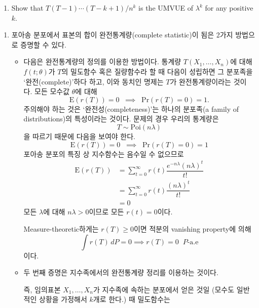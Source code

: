\documentclass[answers]{exam}
\begin{document}
\begin{questions}
\begin{enumerate}
    \item Show that $T\left(T-1\right)\cdots \left(T-k+1\right)/n^{k}$ is the UMVUE of $\lambda^{k}$ for any positive $k$.
   \end{enumerate}
   \begin{solution}
    \begin{enumerate}
      \item 포아송 분포에서 표본의 합이 완전통계량(complete statistic)이 됨은 2가지 방법으로 증명할 수 있다.
      \begin{itemize}
        \item 다음은 완전통계량의 정의를 이용한 방법이다. 통계량 $T\left(X_{1},\ldots,X_{n}\right)$에 대해 $f\left(t;\theta\right)$가 $T$의 밀도함수 혹은 질량함수라 할 때 다음이 성립하면 그 분포족을 `완전(complete)'하다 하고, 이와 동치인 명제는 $T$가 완전통계량이라는 것이다. 모든 모수값 $\theta$에 대해
        $$
          \mathrm{E}\left(r\left(T\right)\right)=0\;\;\implies\;\;\mathrm{Pr}\left(r\left(T\right)=0\right)=1.
        $$
        주의해야 하는 것은 `완전성(completeness)'는 하나의 분포족(a family of distributions)의 특성이라는 것이다. 문제의 경우 우리의 통계량은
        $$
          T \sim \mathrm{Poi}\left(n\lambda\right)
        $$
        을 따르기 때문에 다음을 보여야 한다.
        \begin{equation}
          \mathrm{E}\left(r\left(T\right)\right) = 0 \;\;\implies \;\; \mathrm{Pr}\left(r\left(T\right)=0\right)=1
        \end{equation}
        포아송 분포의 특징 상 지수함수는 음수일 수 없으므로
        \begin{align}
          \mathrm{E}\left(r\left(T\right)\right) &= \sum_{t=0}^{\infty}r\left(t\right)\dfrac{e^{-n\lambda}\left(n\lambda\right)^{t}}{t!}\\
          &= \sum_{t=0}^{\infty}r\left(t\right)\dfrac{\left(n\lambda\right)^{t}}{t!}\\
          &=0
        \end{align}
        모든 $\lambda$에 대해 $n\lambda > 0$이므로 모든 $r\left(t\right)=0$이다.\par
        Measure-theoretic하게는 $r\left(T\right)\geq0$이면 적분의 vanishing property에 의해
        \begin{equation}
          \int r\left(T\right)\,dP=0 \implies r\left(T\right)=0\;\;P\text{-a.e}
        \end{equation}
        이다.
        \item 두 번째 증명은 지수족에서의 완전통계량 정리를 이용하는 것이다. \par 즉, 임의표본 $X_{1},\ldots, X_{n}$가 지수족에 속하는 분포에서 얻은 것일 (모수도 일반적인 상황을 가정해서 $k$개로 한다.) 때 밀도함수는

\end{itemize}
\end{enumerate}
\end{solution}
\end{questions}
\end{document}
